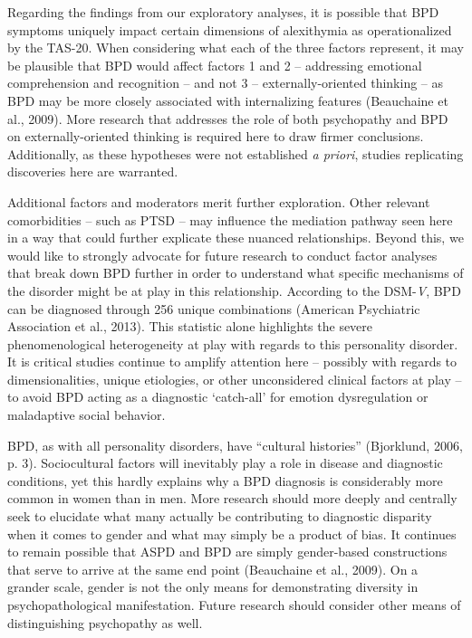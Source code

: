 \documentclass[
  man,floatsintext]{apa7}
\begin{document}
Regarding the findings from our exploratory analyses, it is possible that BPD symptoms uniquely impact certain dimensions of alexithymia as operationalized by the TAS-20. When considering what each of the three factors represent, it may be plausible that BPD would affect factors 1 and 2 -- addressing emotional comprehension and recognition -- and not 3 -- externally-oriented thinking -- as BPD may be more closely associated with internalizing features (Beauchaine et al., 2009). More research that addresses the role of both psychopathy and BPD on externally-oriented thinking is required here to draw firmer conclusions. Additionally, as these hypotheses were not established \emph{a priori}, studies replicating discoveries here are warranted.

Additional factors and moderators merit further exploration. Other relevant comorbidities -- such as PTSD -- may influence the mediation pathway seen here in a way that could further explicate these nuanced relationships. Beyond this, we would like to strongly advocate for future research to conduct factor analyses that break down BPD further in order to understand what specific mechanisms of the disorder might be at play in this relationship. According to the DSM-\emph{V}, BPD can be diagnosed through 256 unique combinations (American Psychiatric Association et al., 2013). This statistic alone highlights the severe phenomenological heterogeneity at play with regards to this personality disorder. It is critical studies continue to amplify attention here -- possibly with regards to dimensionalities, unique etiologies, or other unconsidered clinical factors at play -- to avoid BPD acting as a diagnostic `catch-all' for emotion dysregulation or maladaptive social behavior.

BPD, as with all personality disorders, have ``cultural histories'' (Bjorklund, 2006, p. 3). Sociocultural factors will inevitably play a role in disease and diagnostic conditions, yet this hardly explains why a BPD diagnosis is considerably more common in women than in men. More research should more deeply and centrally seek to elucidate what many actually be contributing to diagnostic disparity when it comes to gender and what may simply be a product of bias. It continues to remain possible that ASPD and BPD are simply gender-based constructions that serve to arrive at the same end point (Beauchaine et al., 2009). On a grander scale, gender is not the only means for demonstrating diversity in psychopathological manifestation. Future research should consider other means of distinguishing psychopathy as well.
\end{document}
